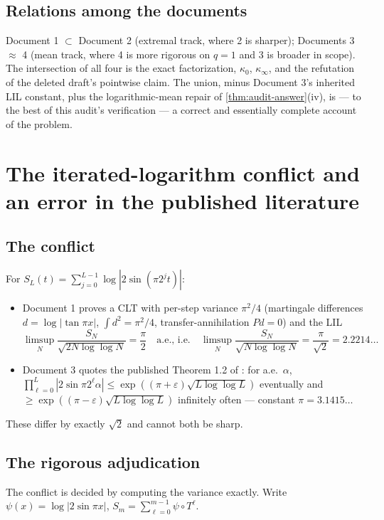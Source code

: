 \documentclass[11pt,oneside]{article}
\theoremstyle{definition}
\theoremstyle{remark}
\newcommand{\T}{T}
\begin{document}
\subsection{Relations among the documents}

Document 1 $\subset$ Document 2 (extremal track, where 2 is sharper);
Documents 3 $\approx$ 4 (mean track, where 4 is more rigorous on $q=1$
and 3 is broader in scope).  The intersection of all four is the exact
factorization, $\kappa_0$, $\kappa_\infty$, and the refutation of the
deleted draft's pointwise claim.  The union, minus Document 3's inherited
LIL constant, plus the logarithmic-mean repair of
\cref{thm:audit-answer}(iv), is --- to the best of this audit's
verification --- a correct and essentially complete account of the
problem.

\section{The iterated-logarithm conflict and an error in the published
literature}
\label{sec:lil}

\subsection{The conflict}

For $S_L(t)=\sum_{j=0}^{L-1}\log|2\sin(\pi2^jt)|$:
\begin{itemize}
\item Document 1 proves a CLT with per-step variance $\pi^2/4$
(martingale differences $d=\log|\tan\pi x|$, $\int d^2=\pi^2/4$,
transfer-annihilation $Pd=0$) and the LIL
\[
 \limsup_{N}\frac{S_N}{\sqrt{2N\log\log N}}=\frac\pi2
 \quad\text{a.e., i.e.}\quad
 \limsup_{N}\frac{S_N}{\sqrt{N\log\log N}}=\frac{\pi}{\sqrt2}
 =2.2214\ldots
\]
\item Document 3 quotes the published Theorem 1.2 of \cite{ahl2017}:
for a.e.\ $\alpha$,
$\prod_{\ell=0}^{L}|2\sin\pi2^\ell\alpha|
\le\exp((\pi+\varepsilon)\sqrt{L\log\log L})$ eventually and
$\ge\exp((\pi-\varepsilon)\sqrt{L\log\log L})$ infinitely often ---
constant $\pi=3.1415\ldots$
\end{itemize}
These differ by exactly $\sqrt2$ and cannot both be sharp.

\subsection{The rigorous adjudication}

The conflict is decided by computing the variance exactly.  Write
$\psi(x)=\log|2\sin\pi x|$, $S_m=\sum_{\ell=0}^{m-1}\psi\circ\T^\ell$.
\end{document}

